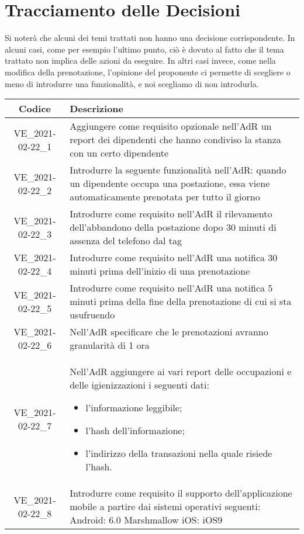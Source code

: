 \section*{Tracciamento delle Decisioni}
Si noterà che alcuni dei temi trattati non hanno una decisione corrispondente. In alcuni casi, come per esempio l'ultimo punto, ciò è dovuto al fatto che il tema trattato non implica delle azioni da eseguire. In altri casi invece, come nella modifica della prenotazione, l'opinione del proponente ci permette di scegliere o meno di introdurre una funzionalità, e noi scegliamo di non introdurla.

\begin{center}
	\begin{longtable}{|c|p{13cm}|}
	\hline
	\rowcolor{lighter-grayer}
	\textbf{Codice} & \textbf{Descrizione} \\
	\hline
	\endfirsthead

	\hline
	VE\_2021-02-22\_1 & Aggiungere come requisito opzionale nell'AdR un report dei dipendenti che hanno condiviso la stanza con un certo dipendente \\
	VE\_2021-02-22\_2 & Introdurre la seguente funzionalità nell'AdR: quando un dipendente occupa una postazione, essa viene automaticamente prenotata per tutto il giorno  \\
	VE\_2021-02-22\_3 & Introdurre come requisito nell'AdR il rilevamento dell'abbandono della postazione dopo 30 minuti di assenza del telefono dal tag \\
	VE\_2021-02-22\_4 & Introdurre come requisito nell'AdR una notifica 30 minuti prima dell'inizio di una prenotazione \\
	VE\_2021-02-22\_5 & Introdurre come requisito nell'AdR una notifica 5 minuti prima della fine della prenotazione di cui si sta usufruendo \\
	VE\_2021-02-22\_6 & Nell'AdR specificare che le prenotazioni avranno granularità di 1 ora \\
	VE\_2021-02-22\_7 & Nell'AdR aggiungere ai vari report delle occupazioni e delle igienizzazioni i seguenti dati:
	\begin{itemize}
		\item l'informazione leggibile;
		\item l'hash dell'informazione;
		\item l'indirizzo della transazioni nella quale risiede l'hash.
	\end{itemize} \\
	VE\_2021-02-22\_8 & Introdurre come requisito il supporto dell'applicazione mobile a partire dai sistemi operativi seguenti:\newline
	Android: 6.0 Marshmallow\newline
	iOS: iOS9 \\							
	\hline

	\end{longtable}
\end{center}